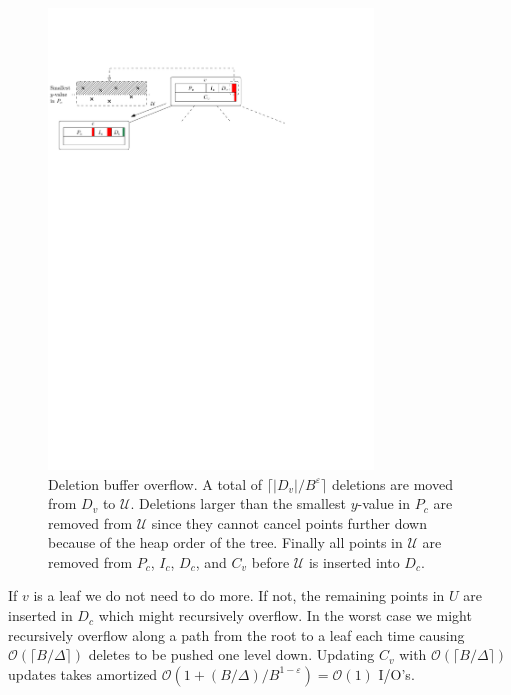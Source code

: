 \documentclass[twoside,11pt,openright]{report}
\def \epsilon {\varepsilon}
\begin{document}
\begin{enumerate}[label=(\roman*)]
\clearpage	

	\begin{figure}[t]
		\centering
		\includegraphics[width=0.77\textwidth]{../figures/brodal_deletion_buffer_overflow}
		\caption{Deletion buffer overflow. A total of $\lceil \lvert D_v \rvert /B^\epsilon \rceil$ deletions are moved from $D_v$ to $\mathcal{U}$. Deletions larger than the smallest $y$-value in $P_c$ are removed from $\mathcal{U}$ since they cannot cancel points further down because of the heap order of the tree. Finally all points in $\mathcal{U}$ are removed from $P_c$, $I_c$, $D_c$, and $C_v$ before $\mathcal{U}$ is inserted into $D_c$.}
		\label{fig:brodal_deletion_buffer_overflow}
	\end{figure}
	
	If $v$ is a leaf we do not need to do more. If not, the remaining points in $U$ are inserted in $D_c$ which might recursively overflow. In the worst case we might recursively overflow along a path from the root to a leaf each time causing $\mathcal{O}(\lceil B / \Delta \rceil)$ deletes to be pushed one level down. Updating $C_v$ with $\mathcal{O}(\lceil B / \Delta \rceil)$ updates takes amortized $\mathcal{O}(1+ (B/\Delta) / B^{1-\epsilon}) = \mathcal{O}(1)$ I/O's.
	

\end{enumerate}
\end{document}

